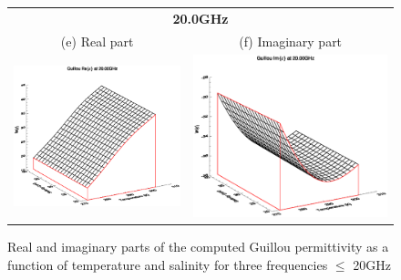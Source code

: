 \begin{figure}[htp]
\begin{tabular}{c c}
    \multicolumn{2}{c}{\sffamily\textbf{20.0GHz}}\\
    \textsf{(e) Real part} &
    \textsf{(f) Imaginary part} \\
    \includegraphics[bb=135 240 508 540,clip,scale=0.5]{graphics/Guillou/e_re_20.00GHz.eps} &
    \includegraphics[bb=135 240 508 540,clip,scale=0.5]{graphics/Guillou/e_im_20.00GHz.eps}
  \end{tabular}
  \caption{Real and imaginary parts of the computed Guillou permittivity as a function of temperature and salinity for three frequencies $\le$ 20GHz}
  \label{fig:guillou_permittivity}
\end{figure}



